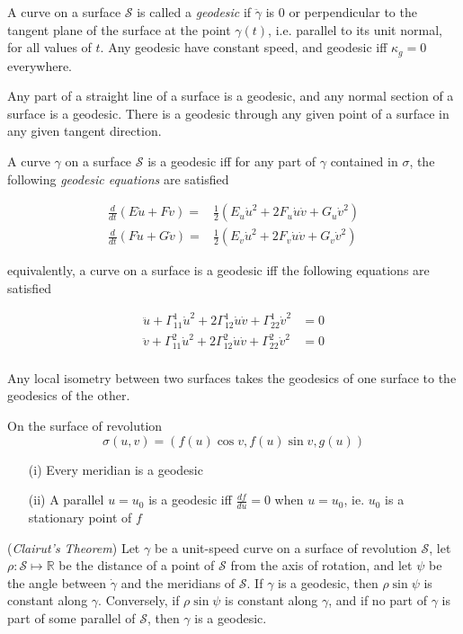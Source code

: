 \documentclass[12pt]{article}
\begin{document}
\begin{multicols*}{2}
A curve on a surface $\mathcal{S}$ is called a \textit{geodesic} if $\ddot{\gamma}$ is 0 or perpendicular to the tangent plane of the surface at the point $\gamma(t)$, i.e. parallel to its unit normal, for all values of $t$. Any geodesic have constant speed, and geodesic iff $\kappa_g = 0$ everywhere.

Any part of a straight line of a surface is a geodesic, and any normal section of a surface is a geodesic. There is a geodesic through any given point of a surface in any given tangent direction.

A curve $\gamma$ on a surface $\mathcal{S}$ is a geodesic iff for any part of $\gamma$ contained in $\sigma$, the following \textit{geodesic equations} are satisfied

\[\begin{aligned}
    \frac{d}{dt}(E\dot{u} + F\dot{v})=&\frac{1}{2}(E_u\dot{u}^2 + 2F_u\dot{u}\dot{v}+ G_u\dot{v}^2)\\
    \frac{d}{dt}(F\dot{u} + G\dot{v})=&\frac{1}{2}(E_v\dot{u}^2 + 2F_v\dot{u}\dot{v}+ G_v\dot{v}^2)
\end{aligned}\]

equivalently, a curve on a surface is a geodesic iff the following equations are satisfied

\[\begin{aligned}
    \ddot{u} + \Gamma_{11}^1\dot{u}^2 + 2\Gamma_{12}^1\dot{u}\dot{v} + \Gamma_{22}^1 \dot{v}^2 &= 0\\
    \ddot{v} + \Gamma_{11}^2\dot{u}^2 + 2\Gamma_{12}^2\dot{u}\dot{v} + \Gamma_{22}^2 \dot{v}^2 &= 0\\
\end{aligned}\]

Any local isometry between two surfaces takes the geodesics of one surface to the geodesics of the other.

On the surface of revolution \[\sigma(u, v) = (f(u)\cos{v}, f(u)\sin{v}, g(u))\]
\begin{enumerate}
    \item [(i)] Every meridian is a geodesic
    \item [(ii)] A parallel $u = u_0$ is a geodesic iff $\frac{df}{du} = 0$ when $u = u_0$, ie. $u_0$ is a stationary point of $f$
\end{enumerate}

(\textit{Clairut's Theorem}) Let $\gamma$ be a unit-speed curve on a surface of revolution $\mathcal{S}$, let $\rho : \mathcal{S} \mapsto \mathbb{R}$ be the distance of a point of $\mathcal{S}$ from the axis of rotation, and let $\psi$ be the angle between $\dot{\gamma}$ and the meridians of $\mathcal{S}$. If $\gamma$ is a geodesic, then $\rho\sin\psi$ is constant along $\gamma$. Conversely, if $\rho\sin\psi$ is constant along $\gamma$, and if no part of $\gamma$ is part of some parallel of $\mathcal{S}$, then $\gamma$ is a geodesic.


\end{multicols*}
\end{document}
